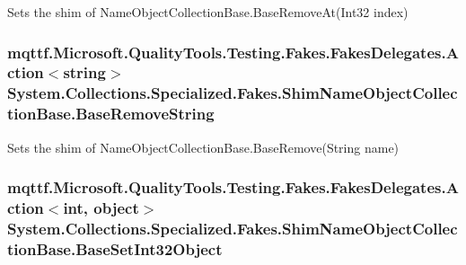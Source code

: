 Sets the shim of Name\-Object\-Collection\-Base.\-Base\-Remove\-At(\-Int32 index)

\hypertarget{class_system_1_1_collections_1_1_specialized_1_1_fakes_1_1_shim_name_object_collection_base_afc1cbd268095c71b76cbcf1b83258144}{
\subsubsection[{Base\-Remove\-String}]{\setlength{\rightskip}{0pt plus 5cm}mqttf.\-Microsoft.\-Quality\-Tools.\-Testing.\-Fakes.\-Fakes\-Delegates.\-Action$<$string$>$ System.\-Collections.\-Specialized.\-Fakes.\-Shim\-Name\-Object\-Collection\-Base.\-Base\-Remove\-String\hspace{0.3cm}{\ttfamily [set]}}}\label{class_system_1_1_collections_1_1_specialized_1_1_fakes_1_1_shim_name_object_collection_base_afc1cbd268095c71b76cbcf1b83258144}


Sets the shim of Name\-Object\-Collection\-Base.\-Base\-Remove(\-String name)

\hypertarget{class_system_1_1_collections_1_1_specialized_1_1_fakes_1_1_shim_name_object_collection_base_a3449833dd39cf7db2602791c261e7951}{
\subsubsection[{Base\-Set\-Int32\-Object}]{\setlength{\rightskip}{0pt plus 5cm}mqttf.\-Microsoft.\-Quality\-Tools.\-Testing.\-Fakes.\-Fakes\-Delegates.\-Action$<$int, object$>$ System.\-Collections.\-Specialized.\-Fakes.\-Shim\-Name\-Object\-Collection\-Base.\-Base\-Set\-Int32\-Object\hspace{0.3cm}{\ttfamily [set]}}}\label{class_system_1_1_collections_1_1_specialized_1_1_fakes_1_1_shim_name_object_collection_base_a3449833dd39cf7db2602791c261e7951}


